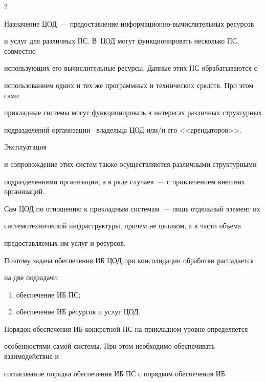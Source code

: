 \begin{multicols}{2}
       


       Назначение ЦОД~--- предоставление ин\-фор\-маци\-он\-но-вы\-чис\-ли\-тель\-ных ресурсов 


и услуг для различных ПС. В~ЦОД могут функционировать несколько ПС, совместно 


использующих его вычислительные ресурсы. Данные этих ПС обрабатываются с 


использованием одних и тех же программных и технических средств. При этом сами 


прикладные сис\-те\-мы могут функционировать в интересах различных структурных 


подразделений организации\,--\,владельца ЦОД или/и его <<арендаторов>>. 





Эксплуатация 


и сопровождение этих сис\-тем также осуществляются различными структурными 


подразделениями организации, а в ряде случаев~--- с привлечением внешних организаций. 





Сам ЦОД по отношению к прикладным сис\-те\-мам~--- лишь отдельный элемент их 


сис\-те\-мо\-тех\-ни\-че\-ской инфраструктуры, причем не целиком, а в части объема 


предоставляемых им услуг и ресурсов.




       Поэтому задача обеспечения ИБ ЦОД при консолидации обработки распадается 


на две подзадачи:


       \begin{enumerate}[(1)]


\item обеспечение ИБ ПС;


\item обеспечение ИБ ресурсов и услуг ЦОД.


\end{enumerate}





       Порядок обеспечения ИБ конкретной ПС на прикладном уровне определяется 


особенностями самой сис\-те\-мы. При этом необходимо обеспечивать взаимодействие и 


согласование порядка обеспечения ИБ ПС с порядком обеспечения ИБ\linebreak



\end{multicols}
